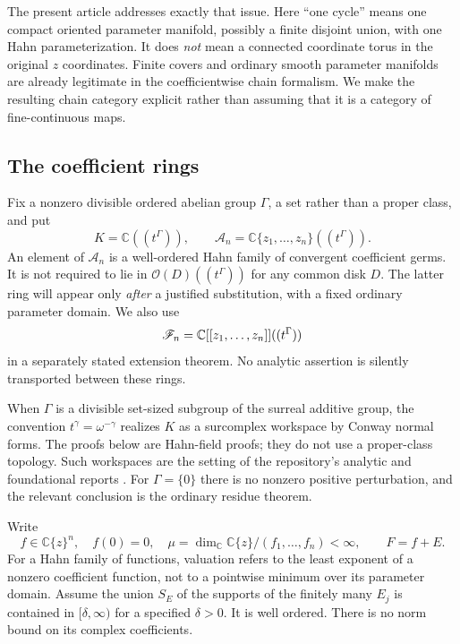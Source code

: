 \documentclass[11pt,letterpaper]{article}
\theoremstyle{definition}
\theoremstyle{remark}
\newcommand{\C}{\mathbb C}\newcommand{\R}{\mathbb R}
\newcommand{\OO}{\mathcal O}\newcommand{\Agerm}{\mathscr A}
\numberwithin{equation}{section}
\begin{document}
The present article addresses exactly that issue. Here ``one cycle'' means one
compact oriented parameter manifold, possibly a finite disjoint union, with one
Hahn parameterization. It does \emph{not} mean a connected coordinate torus in
the original $z$ coordinates. Finite covers and ordinary smooth parameter
manifolds are already legitimate in the coefficientwise chain formalism. We
make the resulting chain category explicit rather than assuming that it is a
category of fine-continuous maps.

\subsection{The coefficient rings}
Fix a nonzero divisible ordered abelian group $\Gamma$, a set rather than a
proper class, and put
\[
 K=\C((t^\Gamma)),\qquad
 \Agerm_n=\C\{z_1,\ldots,z_n\}((t^\Gamma)).
\]
An element of $\Agerm_n$ is a well-ordered Hahn family of convergent coefficient
germs. It is not required to lie in $\OO(D)((t^\Gamma))$ for any common disk
$D$. The latter ring will appear only \emph{after} a justified substitution,
with a fixed ordinary parameter domain. We also use
\[
 \FF_n=\C[[z_1,\ldots,z_n]]((t^\Gamma))
\]
in a separately stated extension theorem. No analytic assertion is silently
transported between these rings.

When $\Gamma$ is a divisible set-sized subgroup of the surreal additive group,
the convention $t^\gamma=\omega^{-\gamma}$ realizes $K$ as a surcomplex
workspace by Conway normal forms. The proofs below are Hahn-field proofs;
they do not use a proper-class topology. Such workspaces are the setting of
the repository's analytic and foundational reports \cite{RepoAnalysis,Repo}.
For $\Gamma=\{0\}$ there is no nonzero positive perturbation, and the relevant
conclusion is the ordinary residue theorem.

Write
\begin{equation}\label{eq:data}
 f\in\C\{z\}^n,\quad f(0)=0,\quad
 \mu=\dim_\C\C\{z\}/(f_1,\ldots,f_n)<\infty,
 \qquad F=f+E.
\end{equation}
For a Hahn family of functions, valuation refers to the least exponent of a
nonzero coefficient function, not to a pointwise minimum over its parameter
domain. Assume the union $S_E$ of the supports of the finitely many $E_j$ is
contained in $[\delta,\infty)$ for a specified $\delta>0$. It is well ordered.
There is no norm bound on its complex coefficients.
\end{document}
